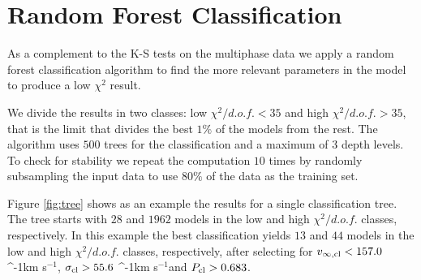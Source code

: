 \documentclass[a4paper,fleqn,usenatbib]{mnras}
\newcommand{\kms}{\ifmmode\mathrm{km\ s}^{-1}\else km s$^{-1}$\fi}
\begin{document}



\appendix
\section{Random Forest Classification}
\label{appendix}

As a complement to the K-S tests on the multiphase data 
we apply a random forest classification algorithm
\citep{james2014introduction} to find the
more relevant parameters in the model to produce a low $\chi^2$
result. 


We divide
the results in two classes: low $\chi^2/d.o.f.<35$ and high
$\chi^2/d.o.f.>35$, that is the limit that divides the best $1\%$ of
the models from the rest. 
The algorithm uses $500$ trees for the classification and a
maximum of $3$ depth levels. 
To check for stability we repeat the computation $10$ times by
randomly subsampling the input data to use $80\%$ of the data as
the training set.

Figure \ref{fig:tree} shows as an example the results for a
single classification tree.
The tree starts with $28$ and $1962$ models in the low and high
$\chi^2/d.o.f.$ classes, respectively. 
In this example the best classification
yields $13$ and $44$ models in the low and high $\chi^2/d.o.f.$
classes, respectively, after selecting for $v_{\infty,{\rm cl}}<157.0$ \kms,
$\sigma_{{\rm cl}}>55.6$ \kms and $P_{\rm cl}>0.683$. 
\end{document}

